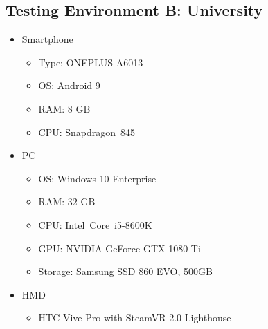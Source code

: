 \begin{appendices}
  \section{Testing Environment B: University}
  \begin{itemize}
    \item Smartphone
    \begin{itemize}
      \item Type: ONEPLUS A6013
      \item \ac{OS}: Android 9
      \item RAM: 8 GB
      \item CPU: Snapdragon\texttrademark\ 845 %
    \end{itemize}
    \item \ac{PC}
    \begin{itemize}
      \item \ac{OS}: Windows 10 Enterprise
      \item RAM: 32 GB
      \item CPU: Intel\textregistered\ Core\texttrademark\ i5-8600K %
      \item GPU: NVIDIA GeForce GTX 1080 Ti
      \item Storage: Samsung SSD 860 EVO, 500GB
    \end{itemize}
    \item \ac{HMD}
    \begin{itemize}
      \item HTC Vive Pro with SteamVR 2.0 Lighthouse
    \end{itemize}
  \end{itemize}

  
\end{appendices}